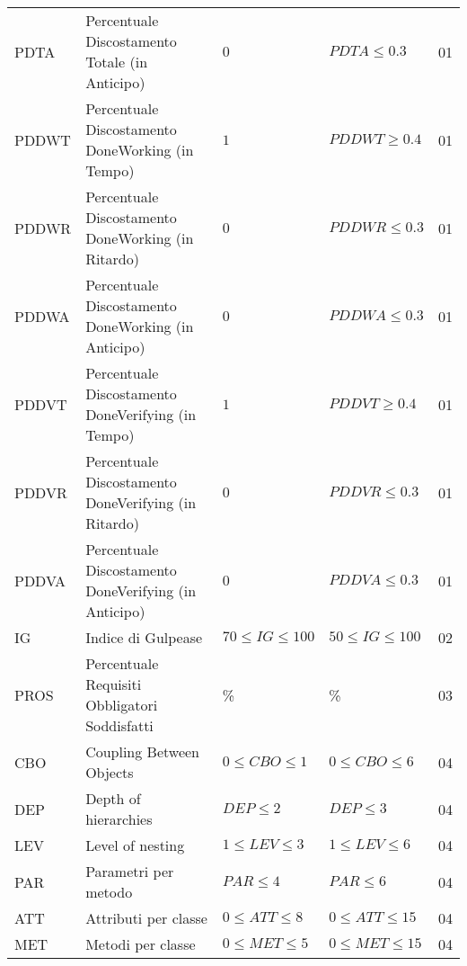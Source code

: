 \begin{longtable}{
		>{\centering}p{}
		>{}p{}
        >{\centering}p{}
        >{\centering}p{}
        >{}p{} }
            PDTA & Percentuale Discostamento Totale (in Anticipo) & $0$ & $PDTA \leq 0.3$ & 01 \\

            PDDWT & Percentuale Discostamento DoneWorking (in Tempo) & $1$ & $PDDWT \geq 0.4$ & 01 \\

            PDDWR & Percentuale Discostamento DoneWorking (in Ritardo) & $0$ & $PDDWR \leq 0.3$ & 01 \\

            PDDWA & Percentuale Discostamento DoneWorking (in Anticipo) & $0$ & $PDDWA \leq 0.3$ & 01 \\

            PDDVT & Percentuale Discostamento DoneVerifying (in Tempo) & $1$ & $PDDVT \geq 0.4$ & 01 \\

            PDDVR & Percentuale Discostamento DoneVerifying (in Ritardo) & $0$ & $PDDVR \leq 0.3$ & 01 \\

            PDDVA & Percentuale Discostamento DoneVerifying (in Anticipo) & $0$ & $PDDVA \leq 0.3$ & 01 \\

            IG & Indice di Gulpease & $70 \leq IG \leq 100$ & $50 \leq IG \leq 100$ & 02 \\

            PROS & Percentuale Requisiti Obbligatori Soddisfatti & 100\% & 100\% & 03 \\

            CBO & Coupling Between Objects & $0\leq CBO \leq 1$ & $0\leq CBO \leq 6$ & 04 \\

            DEP & Depth of hierarchies & $DEP \leq 2$ & $DEP \leq 3$ & 04 \\

            LEV & Level of nesting & $1\leq LEV \leq 3$ & $1\leq LEV \leq 6$ & 04 \\

            PAR & Parametri per metodo & $PAR \leq 4$ & $PAR \leq 6$ & 04 \\

            ATT & Attributi per classe & $0 \leq ATT \leq 8$ & $0 \leq ATT \leq 15$ & 04 \\

            MET & Metodi per classe & $0 \leq MET \leq 5$ & $0 \leq MET \leq 15$ & 04 \\


\end{longtable}
